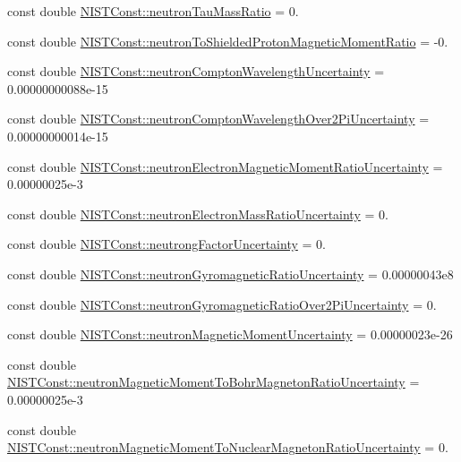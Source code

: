 \begin{DoxyCompactItemize}
const double \hyperlink{group___n_i_s_t_const-_neutron_ga9c3ba7b26cbcc0b2f7f7fa551812683a}{N\+I\+S\+T\+Const\+::neutron\+Tau\+Mass\+Ratio} = 0.
\item 
const double \hyperlink{group___n_i_s_t_const-_neutron_ga7446ad6eb4c1e0b8167d1a1ff5c4cd89}{N\+I\+S\+T\+Const\+::neutron\+To\+Shielded\+Proton\+Magnetic\+Moment\+Ratio} = -\/0.
\item 
const double \hyperlink{group___n_i_s_t_const-_neutron_ga5fbfb355a266a045aa4e26e2c6150ff1}{N\+I\+S\+T\+Const\+::neutron\+Compton\+Wavelength\+Uncertainty} = 0.\+00000000088e-\/15
\item 
const double \hyperlink{group___n_i_s_t_const-_neutron_ga439ee482618c8fa6a6db4fe16b0a7f4f}{N\+I\+S\+T\+Const\+::neutron\+Compton\+Wavelength\+Over2\+Pi\+Uncertainty} = 0.\+00000000014e-\/15
\item 
const double \hyperlink{group___n_i_s_t_const-_neutron_gacb0476e237024ae73115cb69cf2ec595}{N\+I\+S\+T\+Const\+::neutron\+Electron\+Magnetic\+Moment\+Ratio\+Uncertainty} = 0.\+00000025e-\/3
\item 
const double \hyperlink{group___n_i_s_t_const-_neutron_gae3a33d004a2b899af7fbf115d5f66a1b}{N\+I\+S\+T\+Const\+::neutron\+Electron\+Mass\+Ratio\+Uncertainty} = 0.
\item 
const double \hyperlink{group___n_i_s_t_const-_neutron_ga3420096045700dd4b700203f09b40838}{N\+I\+S\+T\+Const\+::neutrong\+Factor\+Uncertainty} = 0.
\item 
const double \hyperlink{group___n_i_s_t_const-_neutron_ga4f48bb36482cdd64b95e17e52939df96}{N\+I\+S\+T\+Const\+::neutron\+Gyromagnetic\+Ratio\+Uncertainty} = 0.\+00000043e8
\item 
const double \hyperlink{group___n_i_s_t_const-_neutron_ga428e1a7239cc03c9e202ac1acbb39d42}{N\+I\+S\+T\+Const\+::neutron\+Gyromagnetic\+Ratio\+Over2\+Pi\+Uncertainty} = 0.
\item 
const double \hyperlink{group___n_i_s_t_const-_neutron_gac34c63a7cdf2e8b0a98c38835dafe19d}{N\+I\+S\+T\+Const\+::neutron\+Magnetic\+Moment\+Uncertainty} = 0.\+00000023e-\/26
\item 
const double \hyperlink{group___n_i_s_t_const-_neutron_ga036634170600c84498e80133e11f1228}{N\+I\+S\+T\+Const\+::neutron\+Magnetic\+Moment\+To\+Bohr\+Magneton\+Ratio\+Uncertainty} = 0.\+00000025e-\/3
\item 
const double \hyperlink{group___n_i_s_t_const-_neutron_ga027ad989f7bdaeb277518dd928470e4e}{N\+I\+S\+T\+Const\+::neutron\+Magnetic\+Moment\+To\+Nuclear\+Magneton\+Ratio\+Uncertainty} = 0.

\end{DoxyCompactItemize}
